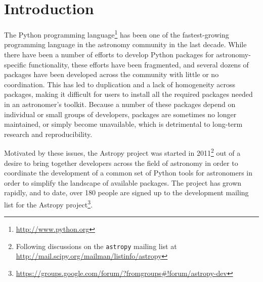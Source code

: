\documentclass[traditabstract]{aa}
\begin{document}

\maketitle


\section{Introduction}


The Python programming language\footnote{\url{http://www.python.org}} has been
one of the fastest-growing programming language in the astronomy community in
the last decade. While there have been a number of efforts to develop Python
packages for astronomy-specific functionality, these efforts have been
fragmented, and several dozens of packages have been developed across the
community with little or no coordination. This has led to duplication and a lack of
homogeneity across packages, making it difficult for users to
install all the required packages needed in an astronomer's
toolkit. Because a number of these packages depend on individual or small groups
of developers, packages are sometimes no longer maintained, or simply become
unavailable, which is detrimental to long-term research and
reproducibility.

Motivated by these issues, the Astropy project was started in 2011\footnote{Following discussions on the
\texttt{astropy} mailing list at
\url{http://mail.scipy.org/mailman/listinfo/astropy}} out of a desire
to bring together developers across the field of astronomy in order to
coordinate the development of a common set of Python tools for astronomers in order to simplify the landscape of available packages. The project has grown rapidly, and to date, over 180 people are
signed up to the development mailing list for the Astropy
project\footnote{
\url{https://groups.google.com/forum/?fromgroups#!forum/astropy-dev}}.
\end{document}
